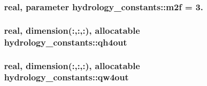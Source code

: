 \subsubsection[{m2f}]{\setlength{\rightskip}{0pt plus 5cm}real, parameter hydrology\+\_\+constants\+::m2f = 3.}\label{namespacehydrology__constants_ab490db8c3db1149de2c3a999ca405462}
\hypertarget{namespacehydrology__constants_aab3e1ed337a2f4bb8ac1ae647b9ebd65}{}
\subsubsection[{qh4out}]{\setlength{\rightskip}{0pt plus 5cm}real, dimension(\+:,\+:,\+:), allocatable hydrology\+\_\+constants\+::qh4out}\label{namespacehydrology__constants_aab3e1ed337a2f4bb8ac1ae647b9ebd65}
\hypertarget{namespacehydrology__constants_a4a968142e8621f39c2e739983340bb25}{}
\subsubsection[{qw4out}]{\setlength{\rightskip}{0pt plus 5cm}real, dimension(\+:,\+:,\+:), allocatable hydrology\+\_\+constants\+::qw4out}\label{namespacehydrology__constants_a4a968142e8621f39c2e739983340bb25}

